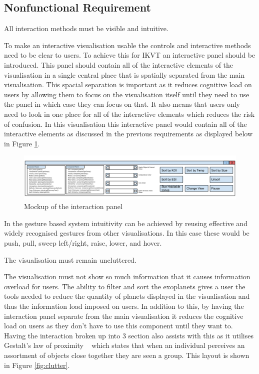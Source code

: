 \subsection{Nonfunctional Requirement}

\begin{enumerate}


{\bf \item[R6.] All interaction methods must be visible and intuitive.}

To make an interactive visualisation usable the controls and interactive
methods need to be clear to users. To achieve this for IKVT an interactive panel
should be introduced. This panel should contain all of the interactive elements
of the visualisation in a single central place that is spatially separated from
the main visualisation. This spacial separation is important as it reduces
cognitive load on users by allowing them to focus on the visualisation itself
until they need to use the panel in which case they can focus on that. It also
means that users only need to look in one place for all of the interactive
elements which reduces the risk of confusion. In this visualisation this
interactive panel would contain all of the interactive elements as discussed in
the previous requirements as displayed below in Figure
\ref{fig:interactionPanelMock}.

\begin{figure}[H]
  \centering
      \includegraphics[width=1\textwidth]{images/allTogether.png}
  \caption{Mockup of the interaction panel}  
  \label{fig:interactionPanelMock}
\end{figure}

In the gesture based system intuitivity can be achieved by reusing effective and widely recognised gestures from other visualisations. In this case these would be push, pull, sweep left/right, raise, lower, and hover.
\clearpage
{\bf \item[R7.] The visualisation must remain uncluttered.}

The visualisation must not show so much information that it
causes information overload for users. The ability to filter and sort the
exoplanets gives a user the tools needed to
reduce the quantity of planets displayed in the visualisation and thus the
information load imposed on users. In addition to this, by having the interaction panel separate from the main visualisation it reduces the cognitive
load on users as they don't have to use this component until they want to. Having the interaction broken up into 3 section also assists with this as it utilises Gestalt's law of proximity \cite{gestalt}~ which states that when an individual perceives an assortment of objects close together they are seen a group. This layout is shown in Figure \ref{fig:clutter}.


\end{enumerate}
